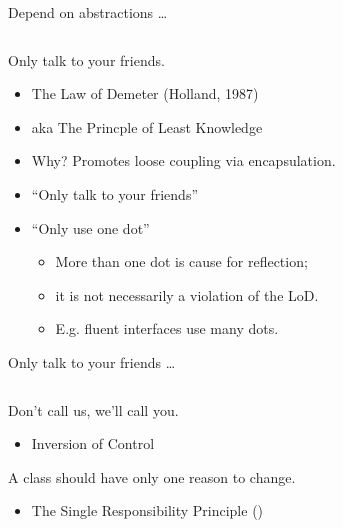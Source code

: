 \documentclass{beamer}
\begin{document}
\begin{frame}{Depend on abstractions \ldots}
    \vspace{0cm}
    \begin{columns}
        \column{\dimexpr\paperwidth-40pt}
        
    \end{columns}
\end{frame}

\begin{frame}{Only talk to your friends.}
    \begin{itemize}
        \item The Law of Demeter (Holland, 1987)
        \item aka The Princple of Least Knowledge
        \item Why? Promotes loose coupling via encapsulation.
        \item ``Only talk to your friends''
        \item ``Only use one dot'' 
            \begin{itemize}
                \item More than one dot is cause for reflection; 
                \item it is not necessarily a violation of the LoD.
                \item E.g. fluent interfaces use many dots.
            \end{itemize}
    \end{itemize}
\end{frame}

\begin{frame}{Only talk to your friends \ldots}
    \vspace{0cm}
    \begin{columns}
        \column{\dimexpr\paperwidth-40pt}
        
    \end{columns}
\end{frame}

\begin{frame}{Don't call us, we'll call you.}
    \begin{itemize}
        \item Inversion of Control
    \end{itemize}
\end{frame}

\begin{frame}{A class should have only one reason to change.}
    \begin{itemize}
        \item The Single Responsibility Principle ()
    \end{itemize}
\end{frame}
\end{document}
